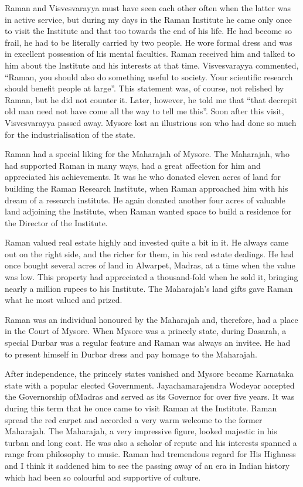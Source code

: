 Raman and Visvesvarayya must have seen each other often when the latter was in active service, but during my days in the Raman Institute he came only once to visit the Institute and that too towards the end of his life. He had become so frail, he had to be literally carried by two people. He wore formal dress and was in excellent possession of his mental faculties. Raman received him and talked to him about the Institute and his interests at that time. Visvesvarayya commented, ``Raman, you should also do something useful to society. Your scientific research should benefit people at large''. This statement was, of course, not relished by Raman, but he did not counter it. Later, however, he told me that ``that decrepit old man need not have come all the way to tell me this''. Soon after this visit, Visvesvarayya passed away. Mysore lost an illustrious son who had done so much for the industrialisation of the state.

\medskip
{}
\smallskip

\noindent
Raman had a special liking for the Maharajah of Mysore. The Maharajah, who had supported Raman in many ways, had a great affection for him and appreciated his achievements. It was he who donated eleven acres of land for building the Raman Research Institute, when Raman approached him with his dream of a research institute. He again donated another four acres of valuable land adjoining the Institute, when Raman wanted space to build a residence for the Director of the Institute.

Raman valued real estate highly and invested quite a bit in it. He always came out on the right side, and the richer for them, in his real estate dealings. He had once bought several acres of land in Alwarpet, Madras, at a time when the value was low. This property had appreciated a thousand-fold when he sold it, bringing nearly a million rupees to his Institute. The Maharajah's land gifts gave Raman what he most valued and prized.

Raman was an individual honoured by the Maharajah and, therefore, had a place in the Court of Mysore. When Mysore was a princely state, during Dasarah, a special Durbar was a regular feature and Raman was always an invitee. He had to present himself in Durbar dress and pay homage to the Maharajah.

After independence, the princely states vanished and Mysore became Karnataka state with a popular elected Government. Jayachamarajendra Wodeyar accepted the Governorship of\break Mad\-ras and served as its Governor for over five years. It was during this term that he once came to visit Raman at the Institute. Raman spread the red carpet and accorded a very warm welcome to the former Maharajah. The Maharajah, a very impressive figure, looked majestic in his turban and long coat. He was also a scholar of repute and his interests spanned a range from philosophy to music. Raman had tremendous regard for His Highness and I think it saddened him to see the passing away of an era in Indian history which had been so colourful and supportive of culture.

